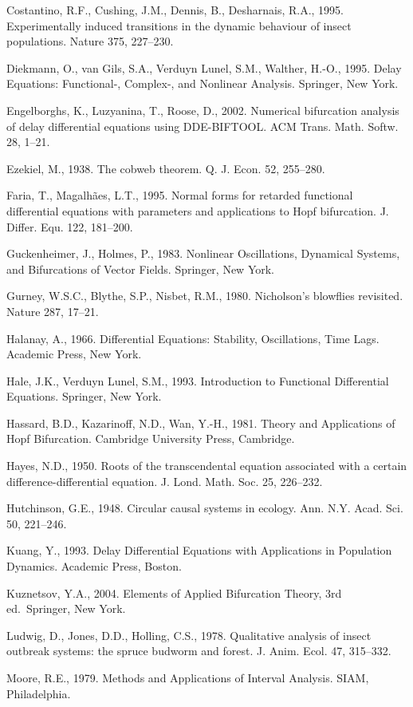 \documentclass[11pt]{article}
\begin{document}
Costantino, R.F., Cushing, J.M., Dennis, B., Desharnais, R.A., 1995.
Experimentally induced transitions in the dynamic behaviour of insect
populations. Nature 375, 227--230.

Diekmann, O., van Gils, S.A., Verduyn Lunel, S.M., Walther, H.-O., 1995.
Delay Equations: Functional-, Complex-, and Nonlinear Analysis.
Springer, New York.

Engelborghs, K., Luzyanina, T., Roose, D., 2002. Numerical bifurcation
analysis of delay differential equations using DDE-BIFTOOL. ACM Trans.
Math. Softw. 28, 1--21.

Ezekiel, M., 1938. The cobweb theorem. Q. J. Econ. 52, 255--280.

Faria, T., Magalh\~aes, L.T., 1995. Normal forms for retarded functional
differential equations with parameters and applications to Hopf
bifurcation. J. Differ. Equ. 122, 181--200.

Guckenheimer, J., Holmes, P., 1983. Nonlinear Oscillations, Dynamical
Systems, and Bifurcations of Vector Fields. Springer, New York.

Gurney, W.S.C., Blythe, S.P., Nisbet, R.M., 1980. Nicholson's blowflies
revisited. Nature 287, 17--21.

Halanay, A., 1966. Differential Equations: Stability, Oscillations, Time
Lags. Academic Press, New York.

Hale, J.K., Verduyn Lunel, S.M., 1993. Introduction to Functional
Differential Equations. Springer, New York.

Hassard, B.D., Kazarinoff, N.D., Wan, Y.-H., 1981. Theory and
Applications of Hopf Bifurcation. Cambridge University Press, Cambridge.

Hayes, N.D., 1950. Roots of the transcendental equation associated with
a certain difference-differential equation. J. Lond. Math. Soc. 25,
226--232.

Hutchinson, G.E., 1948. Circular causal systems in ecology. Ann. N.Y.
Acad. Sci. 50, 221--246.

Kuang, Y., 1993. Delay Differential Equations with Applications in
Population Dynamics. Academic Press, Boston.

Kuznetsov, Y.A., 2004. Elements of Applied Bifurcation Theory, 3rd
ed.~Springer, New York.

Ludwig, D., Jones, D.D., Holling, C.S., 1978. Qualitative analysis of
insect outbreak systems: the spruce budworm and forest. J. Anim. Ecol.
47, 315--332.

Moore, R.E., 1979. Methods and Applications of Interval Analysis. SIAM,
Philadelphia.
\end{document}
